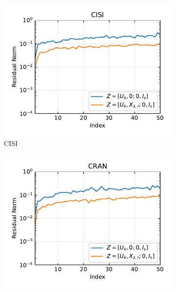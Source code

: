 \begin{figure}[h]
    \centering
    \begin{subfigure}[b]{0.3\textwidth}
        \centering
        \includegraphics[width=\textwidth]{figures/single/cisi/residual_norms_CISI_batch_split_1.pdf}
        \caption{CISI}
        \label{fig:single_cisi_res_norm}
    \end{subfigure}
    \begin{subfigure}[b]{0.3\textwidth}
        \centering
        \includegraphics[width=\textwidth]{figures/single/cran/residual_norms_CRAN_batch_split_1.pdf}

\end{subfigure}
\end{figure}
